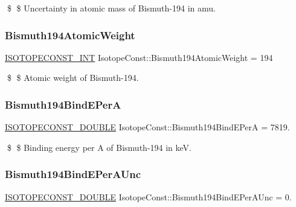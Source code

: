 \$ \$ Uncertainty in atomic mass of Bismuth-\/194 in amu. \mbox{\label{group___isotope_const-_bismuth-_bi194_ga86c3e40a28ec17afe7687538025cbde0}} 
\subsubsection{\texorpdfstring{Bismuth194\+Atomic\+Weight}{Bismuth194AtomicWeight}}
{\footnotesize\ttfamily \mbox{\hyperlink{group___isotope_const-_macros_ga5f18360b3e99483a35c32d789e62621c}{I\+S\+O\+T\+O\+P\+E\+C\+O\+N\+S\+T\+\_\+\+I\+NT}} Isotope\+Const\+::\+Bismuth194\+Atomic\+Weight = 194}

\$ \$ Atomic weight of Bismuth-\/194. \mbox{\label{group___isotope_const-_bismuth-_bi194_gad617f801c6bfc3e76fc96161812679c2}} 
\subsubsection{\texorpdfstring{Bismuth194\+Bind\+E\+PerA}{Bismuth194BindEPerA}}
{\footnotesize\ttfamily \mbox{\hyperlink{group___isotope_const-_macros_ga8f45a7272ce02c0b4c65c44636ed719a}{I\+S\+O\+T\+O\+P\+E\+C\+O\+N\+S\+T\+\_\+\+D\+O\+U\+B\+LE}} Isotope\+Const\+::\+Bismuth194\+Bind\+E\+PerA = 7819.}

\$ \$ Binding energy per A of Bismuth-\/194 in keV. \mbox{\label{group___isotope_const-_bismuth-_bi194_ga0e87cbcd296677fe8337bc8ba4a93326}} 
\subsubsection{\texorpdfstring{Bismuth194\+Bind\+E\+Per\+A\+Unc}{Bismuth194BindEPerAUnc}}
{\footnotesize\ttfamily \mbox{\hyperlink{group___isotope_const-_macros_ga8f45a7272ce02c0b4c65c44636ed719a}{I\+S\+O\+T\+O\+P\+E\+C\+O\+N\+S\+T\+\_\+\+D\+O\+U\+B\+LE}} Isotope\+Const\+::\+Bismuth194\+Bind\+E\+Per\+A\+Unc = 0.}

